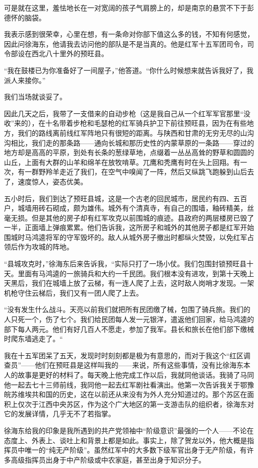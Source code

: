 \documentclass[10pt]{book}
\begin{document}
可是就在这里，羞怯地长在一对宽阔的孩子气肩膀上的，却是南京的悬赏不下于彭德怀的脑袋。

我表示感到很荣幸，心里在想，有一条命对你部下值这么多的钱，不知有何感觉，因此问徐海东，他请我去访问他的部队是不是当真的。他是红军十五军团司令，司令部设在西北八十里外的预旺县。

“我在鼓楼已为你准备好了一间屋子，”他答道。“你什么时候想来就告诉我好了，我派人来接你。”

我们当场就谈妥了。

因此几天之后，我带了一支借来的自动步枪（这是我自己从一个红军军官那里“没收”来的），在十名带着步枪和毛瑟枪的红军骑兵护卫下前往预旺县，因为在有些地方，我们的路线离前线红军阵地只有很短的距离。与陕西和甘肃的无穷无尽的山沟沟相比，我们走的那条路——通向长城和那历史性的内蒙草原的一条路——穿过的地方却是高高的平原，到处有长条的葱绿草地，点缀着一丛丛高耸的野草和圆圆的山丘，上面有大群的山羊和绵羊在放牧啃草。兀鹰和秃鹰有时在头上回翔。有一次，有一群野羚羊走近了我们，在空气中嗅闻了一阵，然后又纵跳飞跑躲到山后去了，速度惊人，姿态优美。

五小时后，我们到达了预旺县城，这是一个古老的回民城市，居民约有四、五百户，城墙用砖石砌成，颇为雄伟。城外有个清真寺，有自己的围墙，釉砖精美，丝毫无损。但是其他的房子却有红军攻克以前围城的痕迹。县政府的两层楼房已毁了一半，正面墙上弹痕累累。他们告诉我，这所房子和城外的其他房子都是红军开始围城时马鸿逵将军的守军毁坏的。敌人从城外房子撤出时都纵火焚毁，以免红军占领后作为攻城的阵地。

“县城攻克时，”徐海东后来告诉我，“实际只打了一场小仗。我们包围封锁预旺县十天。里面有马鸿逵的一旅骑兵和大约一千民团。我们根本没有进攻，到第十天晚上天黑后，我们在城墙上放了云梯，有一连人爬了上去，这时敌人岗哨才发现。一架机枪守住云梯后，我们又有一团人爬了上去。

“没有发生什么战斗。天亮以前我们就把所有民团缴了械，包围了骑兵旅。我们的人只死一个，伤了七个。我们给民团每人发一元银洋，遣返他们回家，给马鸿逵的部下每人两元。他们有好几百人不愿走，参加了我军。县长和旅长在他们部下缴械时爬东墙逃走了。“

我在十五军团呆了五天，发现时时刻刻都是极为有意思的，而对于我这个“红区调查员”——他们在预旺县是这样叫我的——来说，所有这些事情，没有比徐海东本人的故事是更好的材料了。每天晚上他完成工作以后，我就同他谈话。我骑了马同他一起去七十三师前线，我同他一起去红军剧社看演出。他第一次告诉我关于鄂豫皖苏维埃共和国的历史，这在以前还从来没有为外人充分知道过的。那个苏区在面积上仅次于江西中央苏区，作为这个广大地区的第一支游击队的组织者，徐海东对它的发展详情，几乎无不了若指掌。

徐海东给我的印象是我所遇到的共产党领袖中“阶级意识”最强的一个人——不论在态度上、外表上、谈吐上和背景上都是如此。事实上，除了贺龙以外，他大概是指挥员中唯一的“纯无产阶级”。虽然红军中的大多数下级军官出身于无产阶级，有许多高级指挥员出身于中产阶级或中农家庭，甚至出身于知识分子。
\end{document}
